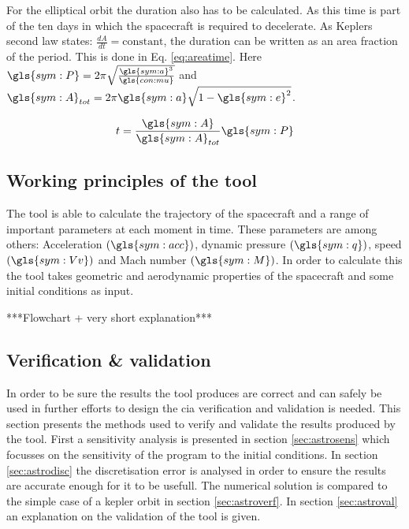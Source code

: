 For the elliptical orbit the duration also has to be calculated. As this time is part of the ten days in which the spacecraft is required to decelerate. As Keplers second law states: $\frac{dA}{dt}=\mbox{constant}$, the duration can be written as an area fraction of the period. This is done in Eq. \ref{eq:areatime}. Here $\gls{sym:P} = 2\pi\sqrt{\frac{\gls{sym:a}^3}{\gls{con:mu}}}$ and $\gls{sym:A}_{tot} = 2\pi \gls{sym:a} \sqrt{1-\gls{sym:e}^2}$.

\begin{equation}
t = \frac{\gls{sym:A}}{\gls{sym:A}_{tot}}\gls{sym:P}
\label{eq:areatime}
\end{equation}

\subsection{Working principles of the tool}
\label{sec:astrowp}
The tool is able to calculate the trajectory of the spacecraft and a range of important parameters at each moment in time. These parameters are among others: Acceleration $\left(\gls{sym:acc}\right)$, dynamic pressure $\left(\gls{sym:q}\right)$, speed $\left(\gls{sym:Vv}\right)$ and Mach number $\left(\gls{sym:M}\right)$. In order to calculate this the tool takes geometric and aerodynamic properties of the spacecraft and some initial conditions as input.

***Flowchart + very short explanation***\\

\subsection{Verification \& validation}
\label{sec:astrovv}

In order to be sure the results the tool produces are correct and can safely be used in further efforts to design the \gls{cia} verification and validation is needed. This section presents the methods used to verify and validate the results produced by the tool. First a sensitivity analysis is presented in section \ref{sec:astrosens} which focusses on the sensitivity of the program to the initial conditions. In section \ref{sec:astrodisc} the discretisation error is analysed in order to ensure the results are accurate enough for it to be usefull. The numerical solution is compared to the simple case of a kepler orbit in section \ref{sec:astroverf}. In section \ref{sec:astroval} an explanation on the validation of the tool is given.

